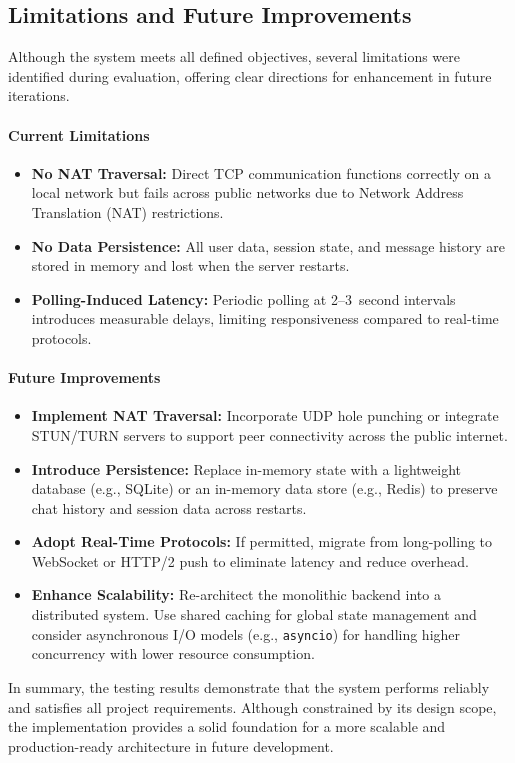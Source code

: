 \subsection{Limitations and Future Improvements}

Although the system meets all defined objectives, several limitations were identified during evaluation, 
offering clear directions for enhancement in future iterations.

\paragraph{Current Limitations}
\begin{itemize}
    \item \textbf{No NAT Traversal:} Direct TCP communication functions correctly on a local network but fails across public networks due to Network Address Translation (NAT) restrictions.
    \item \textbf{No Data Persistence:} All user data, session state, and message history are stored in memory and lost when the server restarts.
    \item \textbf{Polling-Induced Latency:} Periodic polling at 2–3~second intervals introduces measurable delays, limiting responsiveness compared to real-time protocols.
\end{itemize}

\paragraph{Future Improvements}
\begin{itemize}
    \item \textbf{Implement NAT Traversal:} Incorporate UDP hole punching or integrate STUN/TURN servers to support peer connectivity across the public internet.
    \item \textbf{Introduce Persistence:} Replace in-memory state with a lightweight database (e.g., SQLite) or an in-memory data store (e.g., Redis) to preserve chat history and session data across restarts.
    \item \textbf{Adopt Real-Time Protocols:} If permitted, migrate from long-polling to WebSocket or HTTP/2 push to eliminate latency and reduce overhead.
    \item \textbf{Enhance Scalability:} Re-architect the monolithic backend into a distributed system. 
    Use shared caching for global state management and consider asynchronous I/O models (e.g., \texttt{asyncio}) for handling higher concurrency with lower resource consumption.
\end{itemize}

In summary, the testing results demonstrate that the system performs reliably and satisfies all project requirements. 
Although constrained by its design scope, the implementation provides a solid foundation for a more scalable and production-ready architecture in future development.
